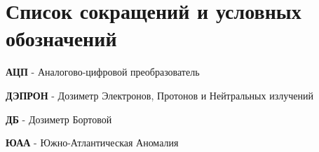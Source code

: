 \chapter*{Список сокращений и условных обозначений}             %

\textbf{АЦП} - Аналогово-цифровой преобразователь

\textbf{ДЭПРОН} - Дозиметр Электронов, Протонов и Нейтральных излучений

\textbf{ДБ} - Дозиметр Бортовой

\textbf{ЮАА} - Южно-Атлантическая Аномалия
